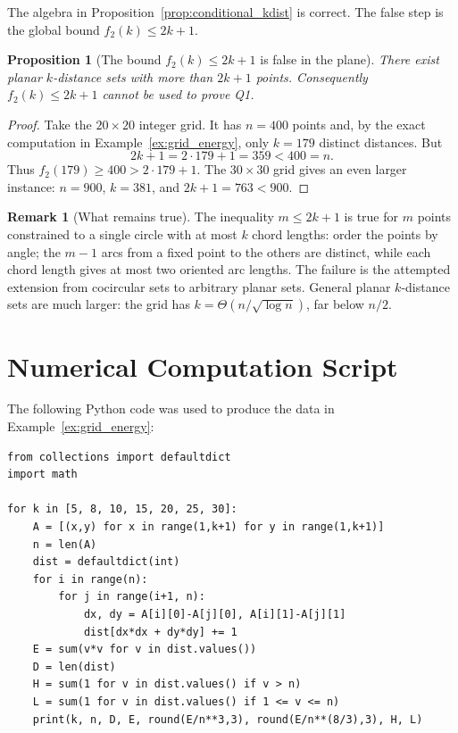 \documentclass[12pt,a4paper]{amsart}
\theoremstyle{plain}
\newtheorem{proposition}[theorem]{Proposition}
\theoremstyle{definition}
\newtheorem{remark}[theorem]{Remark}
\begin{document}
The algebra in Proposition~\ref{prop:conditional_kdist} is correct.
The false step is the global bound $f_2(k) \le 2k+1$.

\begin{proposition}[The bound $f_2(k) \le 2k+1$ is false in the plane]
\label{prop:f2_false}
There exist planar $k$-distance sets with more than $2k+1$ points.
Consequently $f_2(k) \le 2k+1$ cannot be used to prove Q1.
\end{proposition}

\begin{proof}
Take the $20\times20$ integer grid.  It has $n=400$ points and, by the
exact computation in Example~\ref{ex:grid_energy}, only $k=179$ distinct
distances.  But
\[
  2k+1 = 2\cdot179+1 = 359 < 400 = n.
\]
Thus $f_2(179) \ge 400 > 2\cdot179+1$.
The $30\times30$ grid gives an even larger instance:
$n=900$, $k=381$, and $2k+1=763<900$.
\end{proof}

\begin{remark}[What remains true]
The inequality $m\le 2k+1$ is true for $m$ points constrained to a
single circle with at most $k$ chord lengths: order the points by angle;
the $m-1$ arcs from a fixed point to the others are distinct, while each
chord length gives at most two oriented arc lengths.  The failure is the
attempted extension from cocircular sets to arbitrary planar sets.
General planar $k$-distance sets are much larger: the grid has
$k=\Theta(n/\sqrt{\log n})$, far below $n/2$.
\end{remark}

\section{Numerical Computation Script}
\label{app:code}

The following Python code was used to produce the data in
Example~\ref{ex:grid_energy}:

\begin{verbatim}
from collections import defaultdict
import math

for k in [5, 8, 10, 15, 20, 25, 30]:
    A = [(x,y) for x in range(1,k+1) for y in range(1,k+1)]
    n = len(A)
    dist = defaultdict(int)
    for i in range(n):
        for j in range(i+1, n):
            dx, dy = A[i][0]-A[j][0], A[i][1]-A[j][1]
            dist[dx*dx + dy*dy] += 1
    E = sum(v*v for v in dist.values())
    D = len(dist)
    H = sum(1 for v in dist.values() if v > n)
    L = sum(1 for v in dist.values() if 1 <= v <= n)
    print(k, n, D, E, round(E/n**3,3), round(E/n**(8/3),3), H, L)
\end{verbatim}



\end{document}
